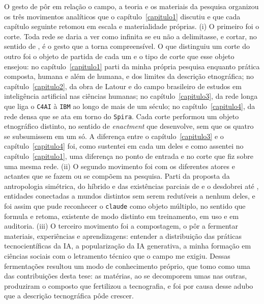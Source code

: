 O gesto de pôr em relação o campo, a teoria e os materiais da pesquisa organizou os três movimentos analíticos que o capítulo~\ref{capitulo1} discutiu e que cada capítulo seguinte retomou em escala e materialidade próprias. (i) O primeiro foi o corte. Toda rede se daria a ver como infinita se eu não a delimitasse, e cortar, no sentido de \textcite{strathern2011cortando}, é o gesto que a torna compreensível. O que distinguiu um corte do outro foi o objeto de partida de cada um e o tipo de corte que esse objeto ensejou: no capítulo~\ref{capitulo1} parti da minha própria pesquisa enquanto prática composta, humana e além de humana, e dos limites da descrição etnográfica; no capítulo~\ref{capitulo2}, da obra de Latour e do campo brasileiro de estudos em inteligência artificial nas ciências humanas; no capítulo~\ref{capitulo3}, da rede longa que liga o \texttt{C4AI} à \texttt{IBM} ao longo de mais de um século; no capítulo~\ref{capitulo4}, da rede densa que se ata em torno do \texttt{Spira}. Cada corte performou um objeto etnográfico distinto, no sentido de \textit{enactment} que \textcite{mol2002body} desenvolve, sem que os quatro se subsumissem em um só. A diferença entre o capítulo~\ref{capitulo3} e o capítulo~\ref{capitulo4} foi, como sustentei em cada um deles e como assentei no capítulo~\ref{capitulo1}, uma diferença no ponto de entrada e no corte que fiz sobre uma mesma rede. (ii) O segundo movimento foi com os diferentes atores e actantes que se fazem ou se compõem na pesquisa. Parti da proposta da antropologia simétrica, do híbrido e das existências parciais de \textcite{Latour1994Jamais} e o desdobrei até \textcite{strathern2005partial}, entidades conectadas a mundos distintos sem serem redutíveis a nenhum deles, e foi assim que pude reconhecer o \texttt{claude} como objeto múltiplo, no sentido que \textcite{mol2002body} formula e \textcite{Law2004After} retoma, existente de modo distinto em treinamento, em uso e em auditoria. (iii) O terceiro movimento foi a compostagem, o pôr a fermentar materiais, experiências e aprendizagens: entender a distribuição das práticas tecnocientíficas da IA, a popularização da IA generativa, a minha formação em ciências sociais com o letramento técnico que o campo me exigiu. Dessas fermentações resultou um modo de conhecimento próprio, que tomo como uma das contribuições desta tese: as matérias, ao se decomporem umas nas outras, produziram o composto que fertilizou a tecnografia, e foi por causa desse adubo que a descrição tecnográfica pôde crescer.

